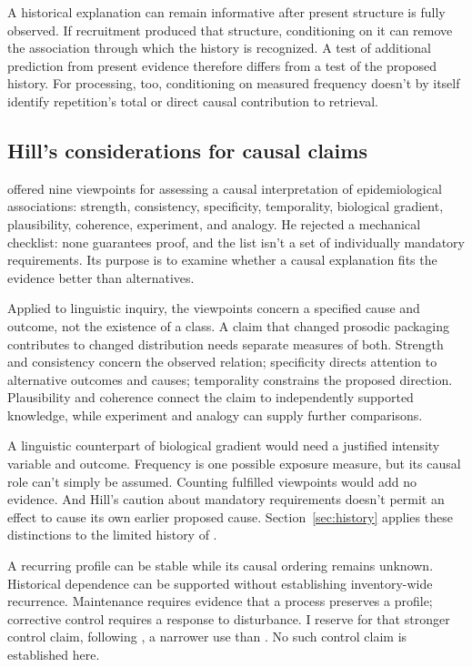 A historical explanation can remain informative after present structure
is fully observed. If recruitment produced that structure, conditioning
on it can remove the association through which the history is recognized.
A test of additional prediction from present evidence therefore differs
from a test of the proposed history. For processing, too, conditioning
on measured frequency doesn't by itself identify repetition's total or
direct causal contribution to retrieval.

\subsection{Hill's considerations for causal claims}\label{sec:hill}

\textcite[295--299]{hill1965} offered nine viewpoints for assessing a
causal interpretation of epidemiological associations: strength,
consistency, specificity, temporality, biological gradient, plausibility,
coherence, experiment, and analogy. He rejected a mechanical checklist:
none guarantees proof, and the list isn't a set of individually mandatory
requirements. Its purpose is to examine whether a causal explanation
fits the evidence better than alternatives.

Applied to linguistic inquiry, the viewpoints concern a specified
cause and outcome, not the existence of a class. A claim that changed
prosodic packaging contributes to changed distribution needs separate
measures of both. Strength and consistency concern the observed relation;
specificity directs attention to alternative outcomes and causes;
temporality constrains the proposed direction. Plausibility and coherence
connect the claim to independently supported knowledge, while experiment
and analogy can supply further comparisons.

A linguistic counterpart of biological gradient would need a justified
intensity variable and outcome. Frequency is one possible exposure
measure, but its causal role can't simply be assumed. Counting fulfilled
viewpoints would add no evidence. And Hill's caution about mandatory
requirements doesn't permit an effect to cause its own earlier proposed
cause. Section~\ref{sec:history} applies these distinctions to the
limited history of .

A recurring profile can be stable while its causal ordering remains
unknown. Historical dependence can be supported without establishing
inventory-wide recurrence. Maintenance requires evidence that a process
preserves a profile; corrective control requires a response to disturbance.
I reserve  for that stronger control claim, following
\textcite{reynolds2026notEveryStableCluster}, a narrower use than
\textcite[143]{boyd1999}. No such control claim is established here.

